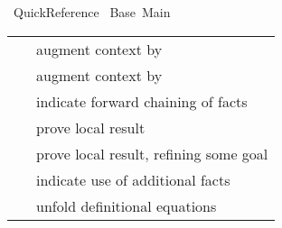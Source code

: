 %
\begin{isabellebody}%
\def\isabellecontext{Quick{\isaliteral{5F}{\isacharunderscore}}Reference}%
%
\isadelimtheory
%
\endisadelimtheory
%
\isatagtheory
{}\isamarkupfalse%
\ Quick{}Reference\isanewline
{}\ Base\ Main\isanewline
{}%
\endisatagtheory
{\isafoldtheory}%
%
\isadelimtheory
%
\endisadelimtheory
%
\isamarkuptrue%
%
\isamarkuptrue%
%
\isamarkuptrue%
%
\begin{isamarkuptext}%
\begin{tabular}{ll}
    \hyperlink{command.fix}{\mbox{\isa{\isacommand{fix}}}}~\isa{x} & augment context by \isa{{\isaliteral{22}{\isachardoublequote}}{\isaliteral{5C3C416E643E}{\isasymAnd}}x{\isaliteral{2E}{\isachardot}}\ {\isaliteral{5C3C626F783E}{\isasymbox}}{\isaliteral{22}{\isachardoublequote}}} \\
    \hyperlink{command.assume}{\mbox{\isa{\isacommand{assume}}}}~\isa{{\isaliteral{22}{\isachardoublequote}}a{\isaliteral{3A}{\isacharcolon}}\ {\isaliteral{5C3C7068693E}{\isasymphi}}{\isaliteral{22}{\isachardoublequote}}} & augment context by \isa{{\isaliteral{22}{\isachardoublequote}}{\isaliteral{5C3C7068693E}{\isasymphi}}\ {\isaliteral{5C3C4C6F6E6772696768746172726F773E}{\isasymLongrightarrow}}\ {\isaliteral{5C3C626F783E}{\isasymbox}}{\isaliteral{22}{\isachardoublequote}}} \\
    \hyperlink{command.then}{\mbox{\isa{\isacommand{then}}}} & indicate forward chaining of facts \\
    \hyperlink{command.have}{\mbox{\isa{\isacommand{have}}}}~\isa{{\isaliteral{22}{\isachardoublequote}}a{\isaliteral{3A}{\isacharcolon}}\ {\isaliteral{5C3C7068693E}{\isasymphi}}{\isaliteral{22}{\isachardoublequote}}} & prove local result \\
    \hyperlink{command.show}{\mbox{\isa{\isacommand{show}}}}~\isa{{\isaliteral{22}{\isachardoublequote}}a{\isaliteral{3A}{\isacharcolon}}\ {\isaliteral{5C3C7068693E}{\isasymphi}}{\isaliteral{22}{\isachardoublequote}}} & prove local result, refining some goal \\
    \hyperlink{command.using}{\mbox{\isa{\isacommand{using}}}}~\isa{a} & indicate use of additional facts \\
    \hyperlink{command.unfolding}{\mbox{\isa{\isacommand{unfolding}}}}~\isa{a} & unfold definitional equations \\

\end{tabular}
\end{isamarkuptext}
\end{isabellebody}
